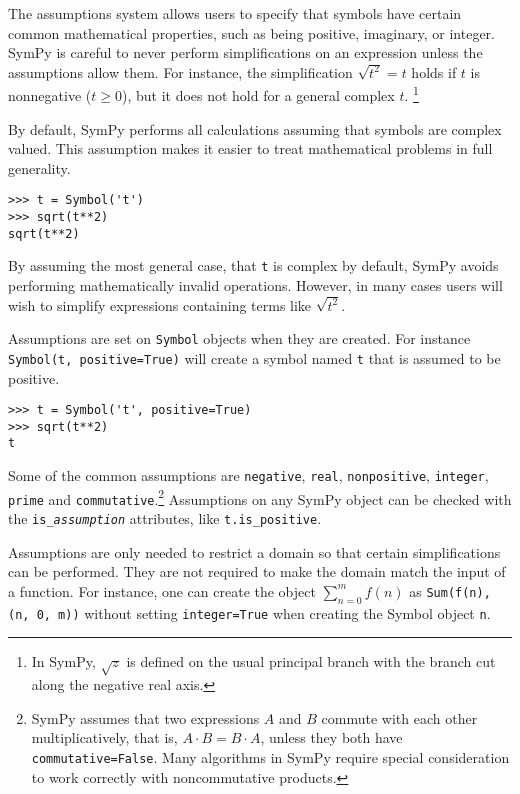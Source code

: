 The assumptions system allows users to specify that symbols have certain
common mathematical properties, such as being positive, imaginary, or
integer. SymPy is careful to never perform simplifications on an expression
unless the assumptions allow them. For instance, the simplification $\sqrt{t^2}
= t$ holds if $t$ is nonnegative ($t\ge 0$), but it does not hold for a general
complex $t$.%
\footnote{In SymPy, $\sqrt{z}$ is defined on the usual principal branch with
the branch cut along the negative real axis.}


By default, SymPy performs all calculations assuming that symbols are
complex valued. This assumption makes it easier to treat mathematical problems
in full generality.
\begin{verbatim}
>>> t = Symbol('t')
>>> sqrt(t**2)
sqrt(t**2)
\end{verbatim}

By assuming the most general case, that \texttt{t} is complex by default, SymPy
avoids performing mathematically invalid operations. However, in many cases
users will wish to simplify expressions containing terms like $\sqrt{t^2}$.

Assumptions are set on \texttt{Symbol} objects when they are created. For
instance \texttt{Symbol(\textquotesingle{}t\textquotesingle{}, positive=True)} will create a symbol named
\texttt{t} that is assumed to be positive.
\begin{verbatim}
>>> t = Symbol('t', positive=True)
>>> sqrt(t**2)
t
\end{verbatim}

Some of the common assumptions are
\texttt{negative}, \texttt{real}, \texttt{nonpositive}, \texttt{integer},
\texttt{prime} and \texttt{commutative}.\footnote{SymPy assumes that two
  expressions $A$ and $B$ commute with each other multiplicatively, that is,
  $A\cdot B=B\cdot A$, unless they both have \texttt{commutative=False}. Many
  algorithms in SymPy require special consideration to work correctly with
  noncommutative products.} Assumptions on any SymPy object can be checked with the
\verb|is_|\texttt{\textit{assumption}} attributes, like \verb|t.is_positive|.

Assumptions are only needed to restrict a domain so that certain
simplifications can be performed. They are not required to make the domain match
the input of a function. For instance, one can create the object
$\sum_{n=0}^m f(n)$ as \verb|Sum(f(n), (n, 0, m))| without setting
\texttt{integer=True} when creating the Symbol object \texttt{n}.

